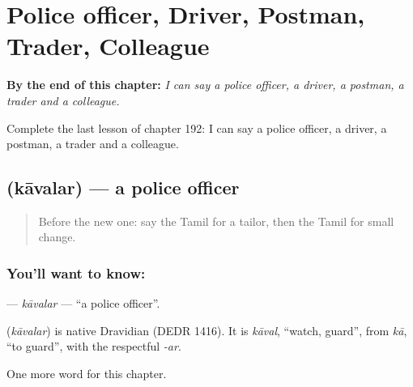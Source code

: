 
\chapter{Police officer, Driver, Postman, Trader, Colleague}
\label{ch:ta-police-officer-driver-postman-trader-colleague}

\begin{chapteropening}
\textbf{By the end of this chapter:} \emph{I can say a police officer, a driver, a postman, a trader and a colleague.}

Complete the last lesson of chapter 192: I can say a police officer, a driver, a postman, a trader and a colleague.
\end{chapteropening}

\section[\texorpdfstring{\ta{காவலர்} (kāvalar)}{காவலர் (kāvalar)}]{ (kāvalar) — a police officer}

\label{lesson:TA-C192-kavalar}



\begin{quote}
Before the new one: say the Tamil for a tailor, then the Tamil for small change.
\end{quote}

\subsection*{You'll want to know: }
\textbf{} — \emph{kāvalar} — \textquotedblleft{}a police officer\textquotedblright{}.

\begin{cousinweb}
\textbf{} (\emph{kāvalar}) is native Dravidian (DEDR 1416). It is \emph{kāval}, \textquotedblleft{}watch, guard\textquotedblright{}, from \emph{kā}, \textquotedblleft{}to guard\textquotedblright{}, with the respectful \emph{-ar}.
\end{cousinweb}

\begin{grammarlens}[title={What you've built}]
One more word for this chapter.
\end{grammarlens}

